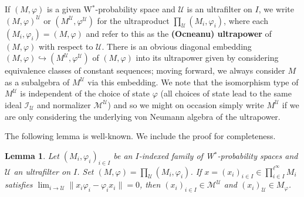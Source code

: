 \documentclass[12pt]{amsart}
\newtheorem{lem}[thm]{Lemma}
\theoremstyle{definition}
\def\cal{\mathcal}
\def\u{\mathsf 1}
\newcommand\cU{{\cal U}}
\def \u{\mathcal U}
\begin{document}
If $(M,\varphi)$ is a given W$^*$-probability space and $\u$ is an ultrafilter on $I$, we write $(M,\varphi)^\u$ or $(M^\u,\varphi^\u)$ for the ultraproduct $\prod_\u (M_i,\varphi_i)$, where each $(M_i,\varphi_i)=(M,\varphi)$ and refer to this as the \textbf{(Ocneanu) ultrapower} of $(M,\varphi)$ with respect to $\u$.  There is an obvious diagonal embedding $(M,\varphi)\hookrightarrow (M^\u,\varphi^\u)$ of $(M,\varphi)$ into its ultrapower given by considering equivalence classes of constant sequences; moving forward, we always consider $M$ as a subalgebra of $M^\u$ via this embedding.  We note that the isomorphism type of $M^\u$ is independent of the choice of state $\varphi$ (all choices of state lead to the same  ideal $\mathcal{I}_\u$ and normalizer $\mathcal{M}^\u$) and so we might on occasion simply write $M^\u$ if we are only considering the underlying von Neumann algebra of the ultrapower.

The following lemma is well-known. We include the proof for completeness. 
\begin{lem}\label{lem asymptotic centralizer}  
Let $(M_i,\varphi_i)_{i\in I}$ be an $I$-indexed family of W$^*$-probability spaces and $\cU$ an  ultrafilter on $I$.  Set $(M,\varphi)=\prod_{\cU}(M_i,\varphi_i)$. If $x=(x_i)_{i\in I}\in \prod_{i\in I}^{\ell^{\infty}}M_i$ satisfies $\displaystyle \lim_{i\to \cU}\|x_i\varphi_i-\varphi_ix_i\|=0$, then $(x_i)_{i\in I}\in \mathcal{M}^{\cU}$ and $(x_i)_{\cU}\in M_{\varphi}$. 
\end{lem}
\end{document}
